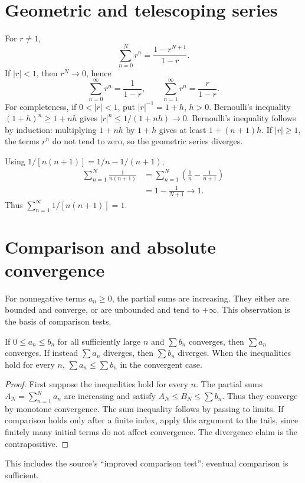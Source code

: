 \section{Geometric and telescoping series}
\begin{example}
For $r\ne1$,
\[
\sum_{n=0}^N r^n=\frac{1-r^{N+1}}{1-r}.
\]
If $|r|<1$, then $r^N\to0$, hence
\[
\sum_{n=0}^{\infty}r^n=\frac1{1-r},\qquad
\sum_{n=1}^{\infty}r^n=\frac r{1-r}.
\]
For completeness, if $0<|r|<1$, put $|r|^{-1}=1+h$, $h>0$.
Bernoulli's inequality $(1+h)^n\geq1+nh$ gives
$|r|^n\leq1/(1+nh)\to0$. Bernoulli's inequality follows by induction:
multiplying $1+nh$ by $1+h$ gives at least $1+(n+1)h$.
If $|r|\geq1$, the terms $r^n$ do not tend to zero, so the geometric
series diverges.
\end{example}

\begin{example}[Telescoping]
Using $1/[n(n+1)]=1/n-1/(n+1)$,
\begin{align*}
\sum_{n=1}^N\frac1{n(n+1)}
&=\sum_{n=1}^N\left(\frac1n-\frac1{n+1}\right)\\
&=1-\frac1{N+1}\longrightarrow1.
\end{align*}
Thus $\sum_{n=1}^{\infty}1/[n(n+1)]=1$.
\end{example}

\section{Comparison and absolute convergence}
For nonnegative terms $a_n\geq0$, the partial sums are increasing.
They either are bounded and converge, or are unbounded and tend to $+\infty$.
This observation is the basis of comparison tests.

\begin{theorem}
If $0\leq a_n\leq b_n$ for all sufficiently large $n$ and $\sum b_n$
converges, then $\sum a_n$ converges. If instead $\sum a_n$ diverges, then
$\sum b_n$ diverges. When the inequalities hold for every $n$,
$\sum a_n\leq\sum b_n$ in the convergent case.
\end{theorem}
\begin{proof}
First suppose the inequalities hold for every $n$. The partial sums
$A_N=\sum_{n=1}^N a_n$ are increasing and satisfy
$A_N\leq B_N\leq\sum b_n$. Thus they converge by monotone convergence.
The sum inequality follows by passing to limits.
If comparison holds only after a finite index, apply this argument to the
tails, since finitely many initial terms do not affect convergence.
The divergence claim is the contrapositive.
\end{proof}
This includes the source's ``improved comparison test'': eventual comparison
is sufficient.

